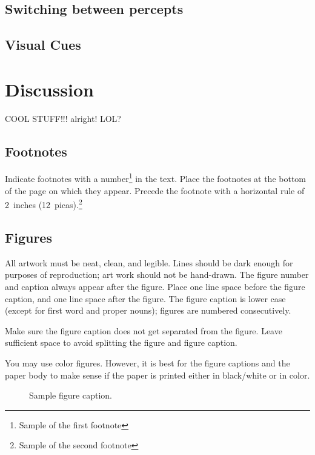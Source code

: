 \documentclass{article} %
\begin{document}
\subsection{Switching between percepts}


\subsection{Visual Cues}


\section{Discussion}

















\newpage

COOL \LaTeXe STUFF!!! alright! LOL?

\subsection{Footnotes}

Indicate footnotes with a number\footnote{Sample of the first footnote} in the
text. Place the footnotes at the bottom of the page on which they appear.
Precede the footnote with a horizontal rule of 2~inches
(12~picas).\footnote{Sample of the second footnote}

\subsection{Figures}

All artwork must be neat, clean, and legible. Lines should be dark
enough for purposes of reproduction; art work should not be
hand-drawn. The figure number and caption always appear after the
figure. Place one line space before the figure caption, and one line
space after the figure. The figure caption is lower case (except for
first word and proper nouns); figures are numbered consecutively.

Make sure the figure caption does not get separated from the figure.
Leave sufficient space to avoid splitting the figure and figure caption.

You may use color figures. 
However, it is best for the
figure captions and the paper body to make sense if the paper is printed
either in black/white or in color.
\begin{figure}[h]
\begin{center}
\fbox{\rule[-.5cm]{0cm}{4cm} \rule[-.5cm]{4cm}{0cm}}
\end{center}
\caption{Sample figure caption.}
\end{figure}
\end{document}
